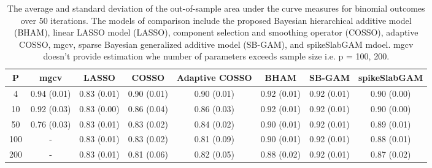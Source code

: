 \begin{table}[ht]
\centering
\begin{tabular}{cccccccc}
  \hline
P & mgcv & LASSO & COSSO & Adaptive COSSO & BHAM & SB-GAM & spikeSlabGAM \\ 
  \hline
  4 & 0.94 (0.01) & 0.83 (0.01) & 0.90 (0.01) & 0.90 (0.01) & 0.92 (0.01) & 0.92 (0.01) & 0.90 (0.00) \\ 
   10 & 0.92 (0.03) & 0.83 (0.00) & 0.86 (0.04) & 0.86 (0.03) & 0.92 (0.01) & 0.92 (0.01) & 0.90 (0.00) \\ 
   50 & 0.76 (0.03) & 0.83 (0.01) & 0.83 (0.02) & 0.84 (0.02) & 0.90 (0.01) & 0.92 (0.01) & 0.89 (0.01) \\ 
  100 & - & 0.83 (0.01) & 0.83 (0.02) & 0.81 (0.09) & 0.90 (0.01) & 0.92 (0.01) & 0.88 (0.01) \\ 
  200 & - & 0.83 (0.01) & 0.81 (0.06) & 0.82 (0.05) & 0.88 (0.02) & 0.92 (0.01) & 0.87 (0.02) \\ 
   \hline
\end{tabular}
\caption{The average and standard deviation of the out-of-sample area under the curve measures
    for binomial outcomes over 50 iterations. The models of comparison include the proposed Bayesian
    hierarchical additive model (BHAM), linear LASSO model (LASSO), component selection and smoothing
    operator (COSSO), adaptive COSSO, mgcv, sparse Bayesian generalized additive model (SB-GAM), and
    spikeSlabGAM mdoel. mgcv doesn't provide
    estimation whe number of parameters exceeds sample size i.e. p = 100, 200.} 
\label{tab:bin_auc}
\end{table}

